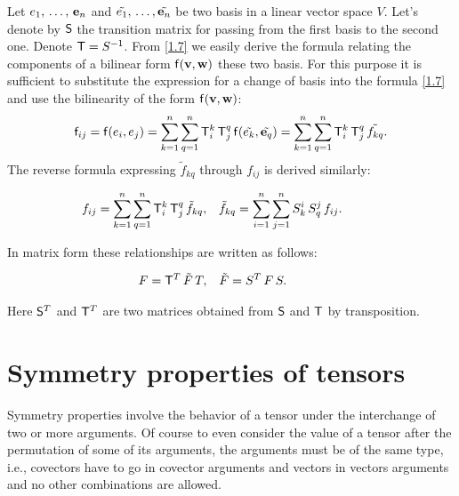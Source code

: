      Let $\bold \vector{e}_1,\,\dots,\,\bold e_n$ and $\tilde{\bold \vector{e}_1},\,\dots,
\tilde{\bold e_n}$ be two basis in a linear vector space $V$. Let's denote
by $\mathsf{S}$ the transition matrix for passing from the first basis to the second
one. Denote $\mathsf{T}=S^{-1}$. From \ref{1.7} we easily derive the formula relating the components of a bilinear form $\mathsf{f}(\mathbf{ v},\mathbf{ w})$ these two
basis. For this purpose it is sufficient to substitute the expression for a change of basis into
the formula \ref{1.7} and use the bilinearity of the form $\mathsf{f}(\bold
v,\mathbf{ w})$:
$$
\tsor{f}_{ij}=\tsor{f}(\bold \vector{e}_i,\bold \vector{e}_j)=\dsum^n_{k=1}\dsum^n_{q=1}\tsor{T}^k_i\,
\tsor{T}^q_j\,\tsor{f}(\tilde{\bold \vector{e}_k},\tilde{\bold e_q})=\dsum^n_{k=1}\dsum^n_{q=1}
\tsor{T}^k_i\,\tsor{T}^q_j\,\tilde{ f_{kq}}.
$$
The reverse formula expressing $\tilde f_{kq}$ through $f_{ij}$ is derived
similarly:

\begin{alignat}{2}
&\hskip -2em
f_{ij}=\dsum^n_{k=1}\dsum^n_{q=1}\tsor{T}^k_i\,\tsor{T}^q_j\,\tilde f_{kq},
&&\tilde f_{kq}=\dsum^n_{i=1}\dsum^n_{j=1}S^i_k\,S^j_q\,f_{ij}.
\label{1.11}
\end{alignat}

In matrix form these relationships are written as follows:

\begin{alignat}{2}
&\hskip -2em
F=\tsor{T}^{T}\,\tilde F\,T,
&&\tilde F=S^{T}\,F\,S.
\label{1.12}
\end{alignat}

Here $\mathsf{S}^{T}$ and $\mathsf{T}^{T}$ are two matrices obtained from 
$\mathsf{S}$ and $\mathsf{T}$ by transposition.\par




\section{Symmetry properties of tensors}

    Symmetry properties involve the behavior of a tensor under the interchange of two or more arguments. Of course to even consider the value of a tensor after the permutation of some of its arguments, the arguments must be  of the same type, i.e., covectors have to go in covector arguments and vectors in vectors arguments and no other combinations are allowed.

